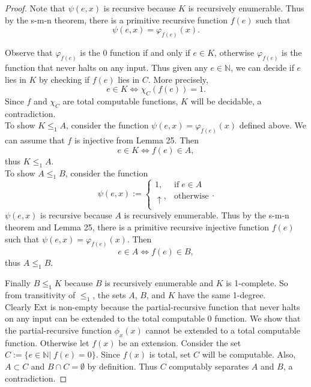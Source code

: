 \documentclass{article}
\begin{document}
\begin{enumerate}[label={\bf Q\arabic*:}]
\begin{proof}
      Note that $\psi(e,x)$ is recursive because $K$ is recursively
      enumerable. Thus by the s-m-n theorem, there is a primitive
      recursive function $f(e)$ such that
      \[\psi(e,x)=\varphi_{f(e)}(x).\]

      Observe that $\varphi_{f(e)}$ is the 0 function if and only if $e\in
      K$, otherwise $\varphi_{f(e)}$ is the function that never halts on
      any input. Thus given any $e\in\mathbb{N}$, we can decide if $e$ lies
      in $K$ by checking if $f(e)$ lies in $C$. More precisely,
      \[e\in K \Leftrightarrow \chi_C(f(e))=1.\]
      Since $f$ and $\chi_C$ are total computable functions, $K$ will be
      decidable, a contradiction. \\

      To show $K\leq_1A$, consider the function
      $\psi(e,x)=\varphi_{f(e)}(x)$ defined above. We can assume that $f$
      is injective from Lemma 25. Then
      \[e\in K \Leftrightarrow f(e)\in A,\]
      thus $K\leq_1A$. \\

      To show $A\leq_1B$, consider the function
      \begin{equation*}
        \psi(e,x) :=
        \begin{cases}
          1, &\text{if}\; e\in A\\
          \uparrow, &\text{otherwise}\\
        \end{cases}.
      \end{equation*}
      $\psi(e,x)$ is recursive because $A$ is recursively enumerable. Thus
      by the s-m-n theorem and Lemma 25, there is a primitive recursive
      injective function $f(e)$ such that $\psi(e,x)=\varphi_{f(e)}(x)$.
      Then
      \[e\in A \Leftrightarrow f(e)\in B,\]
      thus $A\leq_1B$.

      Finally $B\leq_1K$ because $B$ is recursively enumerable and $K$ is
      1-complete. So from transitivity of $\leq_1$, the sets $A$, $B$, and
      $K$ have the same 1-degree. \\

      Clearly $\text{Ext}$ is non-empty because the partial-recursive
      function that never halts on any input can be extended to the
      total computable 0 function. We show that the partial-recursive
      function $\phi_x(x)$ cannot be extended to a total computable
      function. Otherwise let $f(x)$ be an extension. Consider the set
      $C:=\{e\in\mathbb{N}|\; f(e)=0\}$. Since $f(x)$ is total, set $C$
      will be computable. Also, $A\subset C$ and $B\cap C=\emptyset$ by
      definition. Thus $C$ computably separates $A$ and $B$, a
      contradiction.
    \end{proof}
\end{enumerate}
\end{document}

